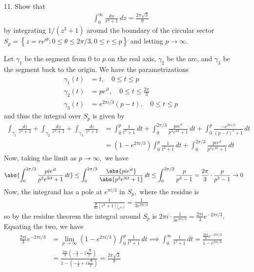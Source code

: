 \documentclass{article}
\begin{document}
\begin{itemize}
	\item[11.] Show that
		\begin{align*}
			\int_0^\infty \frac{dx}{x^3+1}\, dz=\frac{2\pi\sqrt{3}}{9}
		\end{align*}
		by integrating $1/(z^3+1)$ around the boundary of the circular sector $S_p=\left\{ z=re^{i\theta}: 0\le \theta\le 2\pi/3, 0\le r\le p \right\}$ and letting $p\to\infty.$
		\begin{soln}
			Let $\gamma_1$ be the segment from $0$ to $p$ on the real axis, $\gamma_2$ be the arc, and $\gamma_3$ be the segment back to the origin. We have the parametrizations
			\begin{align*}
				\gamma_1(t) &= t, \quad 0\le t\le p \\
				\gamma_2(t) &= pe^{it}, \quad 0\le t\le \frac{2\pi}{3} \\
				\gamma_3(t) &= e^{2\pi i/3}(p-t), \quad 0\le t\le p
			\end{align*}
			and thus the integral over $S_p$ is given by
			\begin{align*}
				\int_{\gamma_1} \frac{dz}{z^3+1}+ \int_{\gamma_2}\frac{dz}{z^3+1} + \int_{\gamma_3} \frac{dz}{z^3+1} &= \int_0^p \frac{1}{t^3+1}\, dt + \int_0^{2\pi/3} \frac{pie^{it}}{p^3e^{3it}+1}\, dt + \int_0^p \frac{-e^{2\pi i/3}}{(p-t)^3+1}\, dt \\
				&= \left( 1-e^{2\pi i/3} \right)\int_0^p \frac{1}{t^3+1}\, dt +\int_0^{2\pi/3}\frac{pie^{it}}{p^3e^{3it}+1}\, dt
			\end{align*}
			Now, taking the limit as $p\to\infty,$ we have
			\begin{align*}
				\abs{\int_0^{2\pi/3} \frac{pie^{it}}{p^3e^{3it}+1}\, dt} &\le \int_0^{2\pi/3} \frac{\abs{pie^{it}}}{\abs{p^3e^{3it}+1}}\, dt \le \int_0^{2\pi/3} \frac{p}{p^3-1} = \frac{2\pi}{3}\cdot \frac{p}{p^3-1}\to 0
			\end{align*}
			Now, the integrand has a pole at $e^{\pi i/3}$ in $S_p,$ where the residue is
			\begin{align*}
				\frac{1}{\frac{d}{dz}\left[ z^3+1 \right]\bigg\vert_{e^{\pi i/3}}} = \frac{1}{3e^{2\pi i/3}}
			\end{align*}
			so by the residue theorem the integral around $S_p$ is $2\pi i\cdot \frac{1}{3e^{2\pi i/3}} = \frac{2\pi i}{3}e^{-2\pi i/3}.$ Equating the two, we have
			\begin{align*}
				\frac{2\pi i}{3}e^{-2\pi i/3} &= \lim_{p\to\infty} \left( 1-e^{2\pi i/3} \right)\int_0^p \frac{1}{t^3+1}\, dt \implies \int_0^{\infty} \frac{1}{t^3+1}\, dt = \frac{\frac{2\pi i}{3}e^{-2\pi i/3}}{1-e^{2\pi i/3}} \\
				&= \frac{\frac{2\pi i}{3}\left( -\frac{1}{2} -i\frac{\sqrt{3}}{2} \right)}{1-\left( -\frac{1}{2} + i\frac{\sqrt{3}}{2} \right)} =\frac{2\pi \sqrt{3}}{9}
			\end{align*}
		\end{soln}


\end{itemize}
\end{document}

